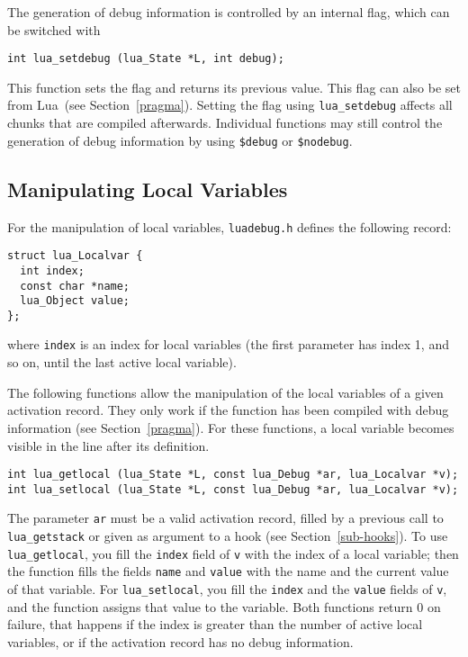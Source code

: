\documentclass[11pt]{article}
\newcommand{\See}[1]{Section~\ref{#1}}
\newcommand{\see}[1]{(see \See{#1})}
\newcommand{\Deffunc}[1]{\index{#1}}
\begin{document}
The generation of debug information is controlled by an internal flag,
which can be switched with
\begin{verbatim}
int lua_setdebug (lua_State *L, int debug);
\end{verbatim}
This function sets the flag and returns its previous value.
This flag can also be set from Lua~\see{pragma}.
Setting the flag using \verb|lua_setdebug| affects all chunks that are
compiled afterwards.
Individual functions may still control the generation of debug information
by using \verb|$debug| or \verb|$nodebug|.

\subsection{Manipulating Local Variables}

For the manipulation of local variables,
\verb|luadebug.h| defines the following record:
\begin{verbatim}
struct lua_Localvar {
  int index;
  const char *name;
  lua_Object value;
};
\end{verbatim}
where \verb|index| is an index for local variables
(the first parameter has index 1, and so on,
until the last active local variable).

\Deffunc{lua_getlocal}\Deffunc{lua_setlocal}
The following functions allow the manipulation of the
local variables of a given activation record.
They only work if the function has been compiled with debug
information \see{pragma}.
For these functions, a local variable becomes
visible in the line after its definition.
\begin{verbatim}
int lua_getlocal (lua_State *L, const lua_Debug *ar, lua_Localvar *v);
int lua_setlocal (lua_State *L, const lua_Debug *ar, lua_Localvar *v);
\end{verbatim}
The parameter \verb|ar| must be a valid activation record,
filled by a previous call to \verb|lua_getstack| or
given as argument to a hook \see{sub-hooks}.
To use \verb|lua_getlocal|,
you fill the \verb|index| field of \verb|v| with the index
of a local variable; then the function fills the fields
\verb|name| and \verb|value| with the name and the current
value of that variable.
For \verb|lua_setlocal|,
you fill the \verb|index| and the \verb|value| fields of \verb|v|,
and the function assigns that value to the variable.
Both functions return 0 on failure, that happens
if the index is greater than the number of active local variables,
or if the activation record has no debug information.
\end{document}
